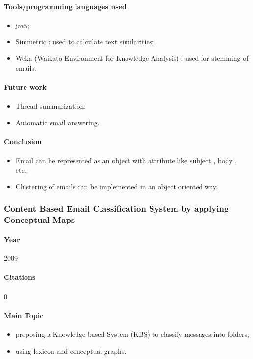 \documentclass[12pt]{article}
\begin{document}
\paragraph{Tools/programming languages used}
\begin{itemize}
    \item java;
    \item Simmetric : used to calculate text similarities;
    \item Weka (Waikato Environment for Knowledge Analysis) : used for stemming of emails.
\end{itemize}

\paragraph{Future work}
\begin{itemize}
    \item Thread summarization;
    \item Automatic email answering.
\end{itemize}

\paragraph{Conclusion}
\begin{itemize}
    \item Email can be represented as an object with attribute like subject , body , etc.;
    \item Clustering of emails can be implemented in an object oriented way.
\end{itemize}



\subsubsection{Content Based Email Classification System by applying Conceptual Maps}

\paragraph{Year} 2009

\paragraph{Citations}0

\paragraph{Main Topic}
\begin{itemize}
    \item proposing a Knowledge based System (KBS) to classify messages into folders;
    \item using lexicon and conceptual graphs.
\end{itemize}
\end{document}
